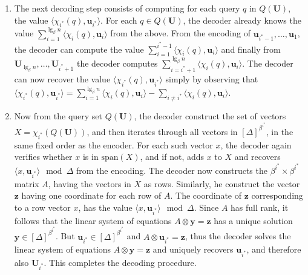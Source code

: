 \documentclass[letterpaper]{article}
\newcommand{\is}{{i^*}}
\newcommand{\vecspan}{\textrm{span}}
\newcommand{\VecSet}{X}
\newcommand{\Matrix}{A}
\newcommand{\uv}{\textbf{u}}
\newcommand{\y}{\textbf{y}}
\newcommand{\U}{\textbf{U}}
\newcommand{\inc}[1]{\chi_{#1}}
\newcommand{\z}{\textbf{z}}
\begin{document}
\begin{enumerate}
\item The next decoding step consists of computing for each query $q$
  in $Q(\U)$, the value $\langle \inc{\is}(q),\uv_\is \rangle$. For each $q \in
  Q(\U)$, the decoder already knows the value $\sum_{i=1}^{\lg_\beta n}
  \langle \inc{i}(q),\uv_i\rangle$ from the above. From the encoding of
  $\uv_{\is-1}, \dots, \uv_1$, the decoder can compute the value
  $\sum_{i=1}^{\is-1} \langle \inc{i}(q),\uv_i \rangle$ and finally from
  $\U_{\lg_\beta n}, \dots, \U_{\is+1}$ the decoder computes
  $\sum_{i=\is+1}^{\lg_\beta n} \langle \inc{i}(q),\uv_i \rangle$. The
  decoder can now recover the value $\langle \inc{\is}(q),\uv_\is
  \rangle$ simply by observing that $\langle \inc{\is}(q),\uv_\is \rangle=
  \sum_{i=1}^{\lg_\beta n} \langle \inc{i}(q),\uv_i\rangle - \sum_{i
    \neq \is} \langle \inc{i}(q),\uv_i \rangle$.

\item Now from the query set $Q(\U)$, the decoder construct the set of
  vectors $\VecSet=\inc{\is}(Q(\U))$, and then iterates through all
  vectors in $[\Delta]^{\beta^\is}$, in the same fixed order as the
  encoder. For each such vector $x$, the decoder again verifies
  whether $x$ is in $\vecspan(\VecSet)$, and if not, adds $x$ to
  $\VecSet$ and recovers $\langle x,\uv_\is \rangle \mod \Delta$ from
  the encoding. The decoder now constructs the $\beta^\is \times
  \beta^\is$ matrix $\Matrix$, having the vectors in $\VecSet$ as
  rows. Similarly, he construct the vector $\z$ having one coordinate
  for each row of $\Matrix$. The coordinate of $\z$ corresponding to a
  row vector $x$, has the value $\langle x, \uv_\is \rangle \mod
  \Delta$. Since $\Matrix$ has full rank, it follows that the linear system of
  equations $\Matrix \otimes \y = \z$ has a unique solution $\y \in
  [\Delta]^{\beta^\is}$. But $\uv_\is \in
  [\Delta]^{\beta^\is}$ and $\Matrix \otimes \uv_\is = \z$, thus the
  decoder solves the linear system of equations $\Matrix \otimes
  \y = \z$ and uniquely recovers $\uv_\is$, and therefore also
  $\U_\is$. This completes the decoding procedure.
\end{enumerate}
\end{document}
